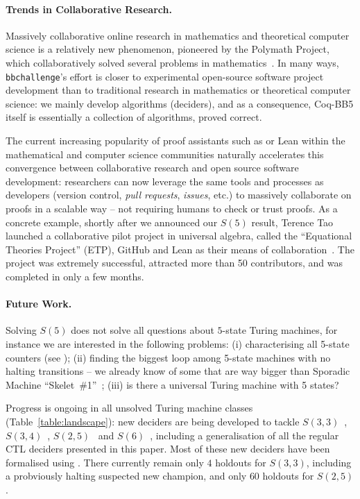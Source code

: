 \documentclass[sigconf,screen]{acmart}
\theoremstyle{definition} %
\numberwithin{equation}{section}
\theoremstyle{definition} %
\newcommand{\CoqBB}{Coq-BB5\xspace}
\begin{document}
\paragraph{Trends in Collaborative Research.} Massively collaborative online research in mathematics and theoretical computer science is a relatively new phenomenon, pioneered by the Polymath Project, which collaboratively solved several problems in mathematics~\cite{Gowers2009}. In many ways, \texttt{bbchallenge}'s effort is closer to experimental open-source software project development than to traditional research in mathematics or theoretical computer science: we mainly develop algorithms (deciders), and as a consequence, \CoqBB itself is essentially a collection of algorithms, proved correct.

The current increasing popularity of proof assistants such as \Coq or Lean within the mathematical and computer science communities naturally accelerates this convergence between collaborative research and open source software development: researchers can now leverage the same tools and processes as developers (version control, \textit{pull requests}, \textit{issues}, etc.) to massively collaborate on proofs in a scalable way -- \ie not requiring humans to check or trust proofs. As a concrete example, shortly after we announced our $S(5)$ result, Terence Tao launched a collaborative pilot project in universal algebra, called the ``Equational Theories Project'' (ETP),  GitHub and Lean as their means of collaboration~\cite{TaoBlog,swh-dir-426b52b,ETPpaper}. The project was extremely successful, attracted more than 50 contributors, and was completed in only a few months.

\paragraph{Future Work.} Solving $S(5)$ does not solve all questions about $5$-state Turing machines, for instance we are interested in the following problems: (i) characterising all 5-state counters (see \cite{BB5}); (ii) finding the biggest loop among 5-state machines with no halting transitions -- we already know of some that are way bigger than Sporadic Machine ``Skelet~\#1''~\cite{ligocki2022motherofgiants}; (iii) is there a universal Turing machine with 5 states?

Progress is ongoing in all unsolved Turing machine classes (Table~\ref{table:landscape}): new deciders are being developed to tackle $S(3,3)$~\cite{ligocki2023bb33}, $S(3,4)$~\cite{ligocki2024bb34ack14}, $S(2,5)$~\cite{ligocki2024bb25} and $S(6)$~\cite{ligocki2024bb6antis}, including a generalisation of all the regular CTL deciders presented in this paper. Most of these new deciders have been formalised using \Coq. There currently remain only $4$ holdouts for $S(3,3)$, including a probviously halting suspected new champion, and only $60$ holdouts for $S(2,5)$.
\end{document}
